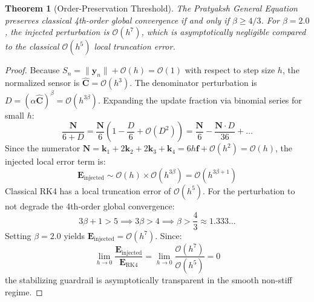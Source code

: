 \documentclass[11pt,a4paper]{article}
\theoremstyle{plain}
\newtheorem{theorem}{Theorem}
\theoremstyle{definition}
\begin{document}
\begin{theorem}[Order-Preservation Threshold]
The Pratyaksh General Equation preserves classical 4th-order global convergence if and only if $\beta \ge 4/3$. For $\beta = 2.0$, the injected perturbation is $\mathcal{O}(h^7)$, which is asymptotically negligible compared to the classical $\mathcal{O}(h^5)$ local truncation error.
\end{theorem}
\begin{proof}
Because $S_n = \|\mathbf{y}_n\| + \mathcal{O}(h) = \mathcal{O}(1)$ with respect to step size $h$, the normalized sensor is $\hat{\mathbf{C}} = \mathcal{O}(h^3)$. The denominator perturbation is $D = (\alpha \hat{\mathbf{C}})^\beta = \mathcal{O}(h^{3\beta})$.
Expanding the update fraction via binomial series for small $h$:
\begin{equation}
\frac{\mathbf{N}}{6 + D} = \frac{\mathbf{N}}{6}\left(1 - \frac{D}{6} + \mathcal{O}(D^2)\right) = \frac{\mathbf{N}}{6} - \frac{\mathbf{N} \cdot D}{36} + \dots
\end{equation}
Since the numerator $\mathbf{N} = \mathbf{k}_1 + 2\mathbf{k}_2 + 2\mathbf{k}_3 + \mathbf{k}_4 = 6h\mathbf{f} + \mathcal{O}(h^2) = \mathcal{O}(h)$, the injected local error term is:
\begin{equation}
\mathbf{E}_{\text{injected}} \sim \mathcal{O}(h) \times \mathcal{O}(h^{3\beta}) = \mathcal{O}(h^{3\beta + 1})
\end{equation}
Classical RK4 has a local truncation error of $\mathcal{O}(h^5)$. For the perturbation to not degrade the 4th-order global convergence:
\begin{equation}
3\beta + 1 > 5 \implies 3\beta > 4 \implies \beta > \frac{4}{3} \approx 1.333\dots
\end{equation}
Setting $\beta = 2.0$ yields $\mathbf{E}_{\text{injected}} = \mathcal{O}(h^7)$. Since:
\begin{equation}
\lim_{h \to 0} \frac{\mathbf{E}_{\text{injected}}}{\mathbf{E}_{\text{RK4}}} = \lim_{h \to 0} \frac{\mathcal{O}(h^7)}{\mathcal{O}(h^5)} = 0
\end{equation}
the stabilizing guardrail is asymptotically transparent in the smooth non-stiff regime.
\end{proof}
\end{document}
